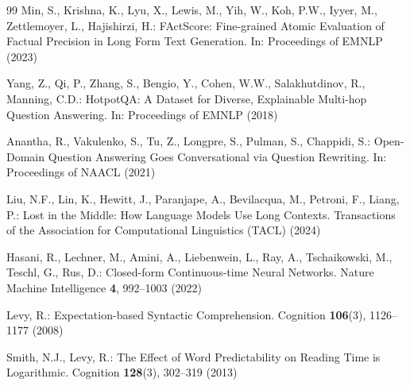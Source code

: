 \documentclass[runningheads]{llncs}
\begin{document}
\begin{thebibliography}{99}
Min, S., Krishna, K., Lyu, X., Lewis, M., Yih, W., Koh, P.W., Iyyer, M.,
Zettlemoyer, L., Hajishirzi, H.:
FActScore: Fine-grained Atomic Evaluation of Factual Precision in Long Form Text Generation.
In: Proceedings of EMNLP (2023)

Yang, Z., Qi, P., Zhang, S., Bengio, Y., Cohen, W.W., Salakhutdinov, R.,
Manning, C.D.:
HotpotQA: A Dataset for Diverse, Explainable Multi-hop Question Answering.
In: Proceedings of EMNLP (2018)

Anantha, R., Vakulenko, S., Tu, Z., Longpre, S., Pulman, S., Chappidi, S.:
Open-Domain Question Answering Goes Conversational via Question Rewriting.
In: Proceedings of NAACL (2021)

Liu, N.F., Lin, K., Hewitt, J., Paranjape, A., Bevilacqua, M., Petroni, F.,
Liang, P.:
Lost in the Middle: How Language Models Use Long Contexts.
Transactions of the Association for Computational Linguistics (TACL) (2024)

Hasani, R., Lechner, M., Amini, A., Liebenwein, L., Ray, A., Tschaikowski, M.,
Teschl, G., Rus, D.:
Closed-form Continuous-time Neural Networks.
Nature Machine Intelligence \textbf{4}, 992--1003 (2022)

Levy, R.:
Expectation-based Syntactic Comprehension.
Cognition \textbf{106}(3), 1126--1177 (2008)

Smith, N.J., Levy, R.:
The Effect of Word Predictability on Reading Time is Logarithmic.
Cognition \textbf{128}(3), 302--319 (2013)

\end{thebibliography}
\end{document}

